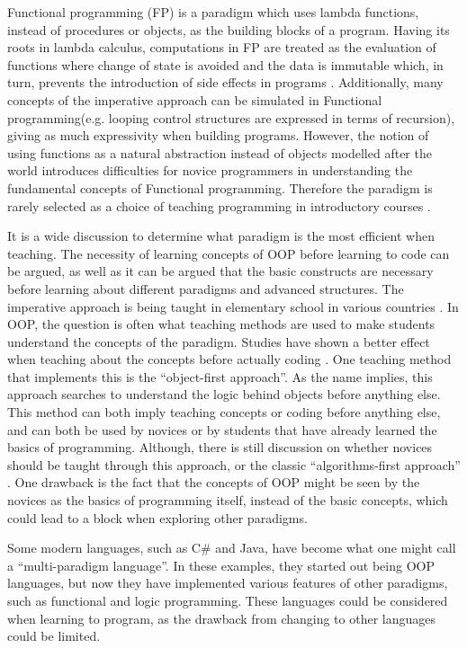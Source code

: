 Functional programming (FP) is a paradigm which uses lambda functions, instead of procedures or objects, as the building blocks of a program. Having its roots in lambda calculus, computations in FP are treated as the evaluation of functions where change of state is avoided and the data is immutable which, in turn, prevents the introduction of side effects in programs \cite{func_programming}. Additionally, many concepts of the imperative approach can be simulated in Functional programming(e.g. looping control structures are expressed in terms of recursion), giving as much expressivity when building programs. However, the notion of using functions as a natural abstraction instead of objects modelled after the world introduces difficulties for novice programmers in understanding the fundamental concepts of Functional programming. Therefore the paradigm is rarely selected as a choice of teaching programming in introductory courses \cite{TeachFuncProgramming}.

It is a wide discussion to determine what paradigm is the most efficient when teaching. The necessity of learning concepts of OOP before learning to code can be argued, as well as it can be argued that the basic constructs are necessary before learning about different paradigms and advanced structures. The imperative approach is being taught in elementary school in various countries \cite{dk_scratch}. In OOP, the question is often what teaching methods are used to make students understand the concepts of the paradigm. Studies have shown a better effect when teaching about the concepts before actually coding \cite{Xinogalos15}. One teaching method that implements this is the ``object-first approach''. As the name implies, this approach searches to understand the logic behind objects before anything else. This method can both imply teaching concepts or coding before anything else, and can both be used by novices or by students that have already learned the basics of programming. Although, there is still discussion on whether novices should be taught through this approach, or the classic ``algorithms-first approach'' \cite{Periyamasy12}. One drawback is the fact that the concepts of OOP might be seen by the novices as the basics of programming itself, instead of the basic concepts, which could lead to a block when exploring other paradigms.

Some modern languages, such as C\# and Java, have become what one might call a ``multi-paradigm language''. In these examples, they started out being OOP languages, but now they have implemented various features of other paradigms, such as functional and logic programming. These languages could be considered when learning to program, as the drawback from changing to other languages could be limited.